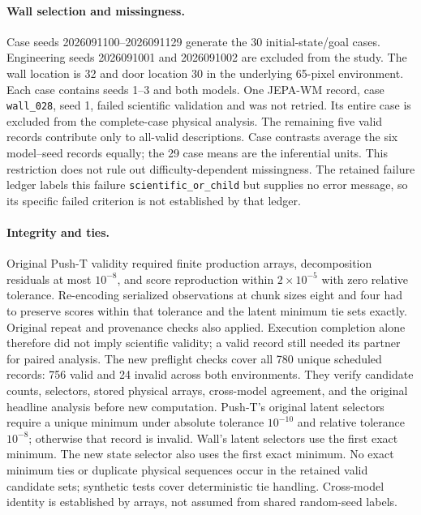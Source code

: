\documentclass{article}
\begin{document}
\paragraph{Wall selection and missingness.}
Case seeds 2026091100--2026091129 generate the 30 initial-state/goal cases.
Engineering seeds 2026091001 and 2026091002 are excluded from the study.
The wall location is 32 and door location 30 in the underlying 65-pixel
environment. Each case contains seeds 1--3 and both models. One JEPA-WM
record, case \texttt{wall\_028}, seed 1, failed scientific validation and was
not retried. Its entire case is excluded from the complete-case physical
analysis. The remaining five valid records contribute only to all-valid
descriptions. Case contrasts average the six model--seed records equally;
the 29 case means are the inferential units. This restriction does not rule
out difficulty-dependent missingness.
The retained failure ledger labels this failure \texttt{scientific\_or\_child}
but supplies no error message, so its specific failed criterion is not
established by that ledger.

\paragraph{Integrity and ties.}
Original Push-T validity required finite production arrays, decomposition
residuals at most $10^{-8}$, and score reproduction within $2\times10^{-5}$
with zero relative tolerance. Re-encoding serialized observations at chunk
sizes eight and four had to preserve scores within that tolerance and the
latent minimum tie sets exactly. Original repeat and provenance checks also
applied. Execution completion alone therefore did not imply scientific
validity; a valid record still needed its partner for paired analysis.
The new preflight checks cover all 780 unique scheduled records: 756 valid
and 24 invalid across both environments. They verify candidate counts,
selectors, stored physical arrays, cross-model agreement, and the original
headline analysis before new computation. Push-T's original latent selectors
require a unique minimum under absolute tolerance $10^{-10}$ and relative
tolerance $10^{-8}$; otherwise that record is invalid. Wall's latent selectors
use the first exact minimum. The new state selector also uses the first exact
minimum. No exact minimum ties or duplicate physical sequences occur in the
retained valid candidate sets; synthetic tests cover deterministic tie
handling. Cross-model identity is established by arrays, not assumed from
shared random-seed labels.
\end{document}
